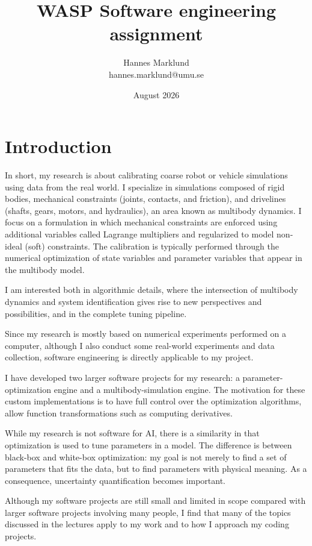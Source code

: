 \documentclass{article}
\title{WASP Software engineering assignment}
\author{Hannes Marklund \\ hannes.marklund@umu.se}
\date{August 2026}
\begin{document}
\maketitle

\section{Introduction}
In short, my research is about calibrating coarse robot or vehicle simulations using data from the real world. 
I specialize in simulations composed of rigid bodies, mechanical constraints (joints, contacts, and friction), and drivelines (shafts, gears, motors, and hydraulics), an area known as multibody dynamics.
I focus on a formulation in which mechanical constraints are enforced using additional variables called Lagrange multipliers and regularized to model non-ideal (soft) constraints.
The calibration is typically performed through the numerical optimization of state variables and parameter variables that appear in the multibody model.

I am interested both in algorithmic details, where the intersection of multibody dynamics and system identification gives rise to new perspectives and possibilities, and in the complete tuning pipeline.

Since my research is mostly based on numerical experiments performed on a computer, although I also conduct some real-world experiments and data collection, software engineering is directly applicable to my project.

I have developed two larger software projects for my research: a parameter-optimization engine and a multibody-simulation engine. 
The motivation for these custom implementations is to have full control over the optimization algorithms, allow function transformations such as computing derivatives.

While my research is not software for AI, there is a similarity in that optimization is used to tune parameters in a model. The difference is between black-box and white-box optimization: my goal is not merely to find a set of parameters that fits the data, but to find parameters with physical meaning. As a consequence, uncertainty quantification becomes important.

Although my software projects are still small and limited in scope compared with larger software projects involving many people, I find that many of the topics discussed in the lectures apply to my work and to how I approach my coding projects.
\end{document}
